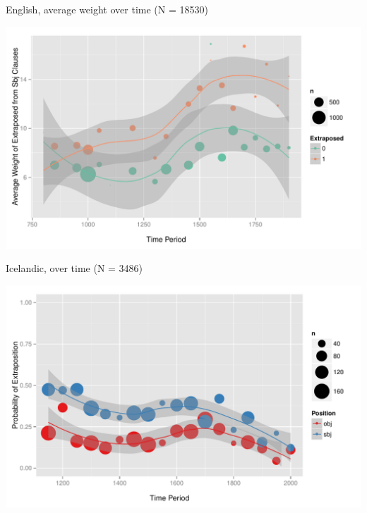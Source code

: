 \documentclass[hyperref={pdfpagelabels=false}]{beamer}
\begin{document}
\begin{frame}{English, average weight over time (N = 18530)}

\begin{center}
\includegraphics[width=1.1\textwidth]{exWeightYearBinned50Loessymeb.pdf}
\end{center}
\end{frame}

\begin{frame}{Icelandic, over time (N = 3486)}

\begin{center}
\includegraphics[width=1.1\textwidth]{exSbjObjYearBinned50Loessice.pdf}
\end{center}
\end{frame}
\end{document}
